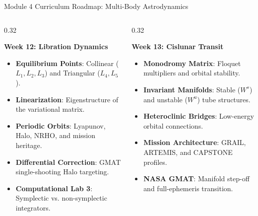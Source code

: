 \documentclass[aspectratio=169, 10pt]{beamer}
\begin{document}
\begin{frame}{Module 4 Curriculum Roadmap: Multi-Body Astrodynamics}
\begin{columns}[t]
        \begin{column}{0.32\textwidth}
            \begin{block}{\textbf{Week 12: Libration Dynamics}}
                \scriptsize
                \begin{itemize}\setlength{\itemsep}{3pt}
                    \item \textbf{Equilibrium Points}: Collinear ($L_1, L_2, L_3$) and Triangular ($L_4, L_5$).
                    \item \textbf{Linearization}: Eigenstructure of the variational matrix.
                    \item \textbf{Periodic Orbits}: Lyapunov, Halo, NRHO, and mission heritage.
                    \item \textbf{Differential Correction}: GMAT single-shooting Halo targeting.
                    \item \textbf{Computational Lab 3}: Symplectic vs. non-symplectic integrators.
                \end{itemize}
            \end{block}
        \end{column}
        
        \begin{column}{0.32\textwidth}
            \begin{block}{\textbf{Week 13: Cislunar Transit}}
                \scriptsize
                \begin{itemize}\setlength{\itemsep}{3pt}
                    \item \textbf{Monodromy Matrix}: Floquet multipliers and orbital stability.
                    \item \textbf{Invariant Manifolds}: Stable ($W^s$) and unstable ($W^u$) tube structures.
                    \item \textbf{Heteroclinic Bridges}: Low-energy orbital connections.
                    \item \textbf{Mission Architecture}: GRAIL, ARTEMIS, and CAPSTONE profiles.
                    \item \textbf{NASA GMAT}: Manifold step-off and full-ephemeris transition.
                \end{itemize}
            \end{block}
        \end{column}
    \end{columns}
\end{frame}
\end{document}
